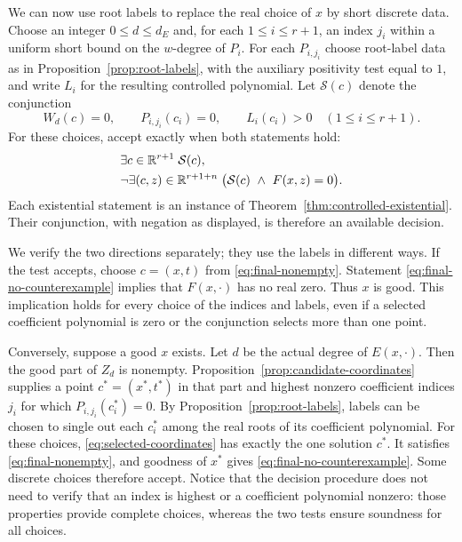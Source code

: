 We can now use root labels to replace the real choice of $x$ by short
discrete data.  Choose an integer $0\le d\le d_E$ and, for each
$1\le i\le r+1$, an index $j_i$ within a uniform short bound on the
$w$-degree of $P_i$.  For each $P_{i,j_i}$ choose root-label data as
in Proposition~\ref{prop:root-labels}, with the auxiliary positivity
test equal to $1$, and write $L_i$ for the resulting controlled
polynomial.  Let $\mathcal S(c)$ denote the conjunction
\begin{equation}\label{eq:selected-coordinates}
 W_d(c)=0,\qquad
 P_{i,j_i}(c_i)=0,\qquad L_i(c_i)>0
 \quad(1\le i\le r+1).
\end{equation}
For these choices, accept exactly when both statements hold:
\begin{align}
 &\exists c\in\mathbb R^{r+1}\;\mathcal S(c),
 \label{eq:final-nonempty}\\
 &\neg\exists(c,z)\in\mathbb R^{r+1+n}\;
       \bigl(\mathcal S(c)\ \wedge\ F(x,z)=0\bigr).
 \label{eq:final-no-counterexample}
\end{align}
Each existential statement is an instance of
Theorem~\ref{thm:controlled-existential}.  Their conjunction, with
negation as displayed, is therefore an available decision.

We verify the two directions separately; they use the labels in
different ways.  If the test accepts, choose $c=(x,t)$ from
\eqref{eq:final-nonempty}.  Statement
\eqref{eq:final-no-counterexample} implies that $F(x,\cdot)$ has no
real zero.  Thus $x$ is good.  This implication holds for every choice
of the indices and labels, even if a selected coefficient polynomial
is zero or the conjunction selects more than one point.

Conversely, suppose a good $x$ exists.  Let $d$ be the actual degree
of $E(x,\cdot)$.  Then the good part of $Z_d$ is nonempty.
Proposition~\ref{prop:candidate-coordinates} supplies a point
$c^*=(x^*,t^*)$ in that part and highest nonzero coefficient indices
$j_i$ for which $P_{i,j_i}(c_i^*)=0$.  By
Proposition~\ref{prop:root-labels}, labels can be chosen to single out
each $c_i^*$ among the real roots of its coefficient polynomial.
For these choices, \eqref{eq:selected-coordinates} has exactly the
one solution $c^*$.  It satisfies
\eqref{eq:final-nonempty}, and goodness of $x^*$ gives
\eqref{eq:final-no-counterexample}.  Some discrete choices therefore
accept.  Notice that the decision procedure does not need to verify
that an index is highest or a coefficient polynomial nonzero: those
properties provide complete choices, whereas the two tests ensure
soundness for all choices.


